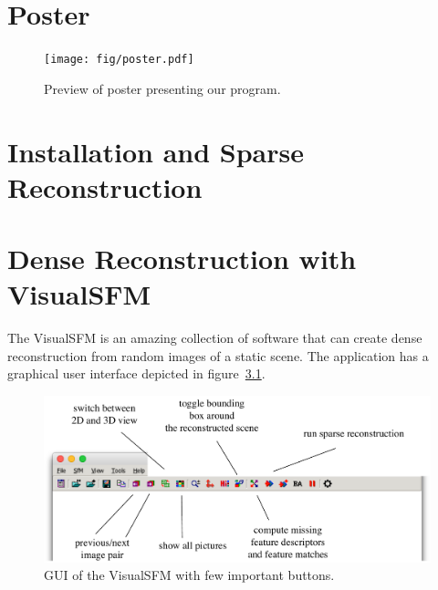 \chapter{Poster}
\begin{figure}[h]
	\begin{center}
		\texttt{[image: fig/poster.pdf]}
	\end{center}
	\caption{Preview of poster presenting our program.}
	\label{fig:posteri}
\end{figure}
\chapter{Installation and Sparse Reconstruction}
\chapter{Dense Reconstruction with VisualSFM}
\label{visualsfm:reconstruction}
The VisualSFM is an amazing collection of software that can create dense reconstruction from random images of a static scene. The application has a graphical user interface depicted in figure~\ref{fig:visualsfm-gui}.
\begin{figure}[h]
	\begin{center}
		\includegraphics[keepaspectratio,width=\textwidth]{fig/visualsfm-gui.pdf}
	\end{center}
	\caption{GUI of the VisualSFM with few important buttons.}
	\label{fig:visualsfm-gui}
\end{figure}
